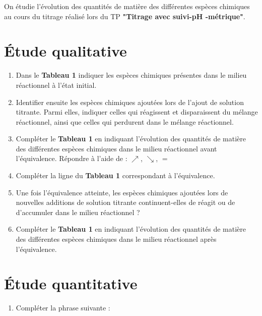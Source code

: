 \documentclass[a4paper,11pt,fleqn]{scrartcl}%
\begin{document}
\maketitle

On étudie l'évolution des quantités de matière des différentes espèces chimiques au cours du titrage réalisé lors du TP \textbf{\textsf{"Titrage avec suivi-pH -métrique"}}.
\section{Étude qualitative}
\begin{enumerate}
	\item Dans le \textbf{Tableau 1} indiquer les espèces chimiques présentes dans le milieu réactionnel à l'état initial.
	\item Identifier ensuite les espèces chimiques ajoutées lors de l'ajout de solution titrante. Parmi elles, indiquer celles qui réagissent et disparaissent du mélange réactionnel, ainsi que celles qui perdurent dans le mélange réactionnel.
	\item Compléter le \textbf{Tableau 1} en indiquant l'évolution des quantités de matière des différentes espèces chimiques dans le milieu réactionnel avant l'équivalence. Répondre à l'aide de : $\nearrow$, $\searrow$, $=$
	\item Compléter la ligne du \textbf{Tableau 1} correspondant à l'équivalence.
	\item Une fois l'équivalence atteinte, les espèces chimiques ajoutées lors de nouvelles additions de solution titrante continuent-elles de réagit ou de d'accumuler dans le milieu réactionnel ?
	\item Compléter le \textbf{Tableau 1} en indiquant l'évolution des quantités de matière des différentes espèces chimiques dans le milieu réactionnel après l'équivalence.
\end{enumerate}

\section{Étude quantitative}
\begin{enumerate}[resume]
	\item Compléter la phrase suivante :
\end{enumerate}
\end{document}
